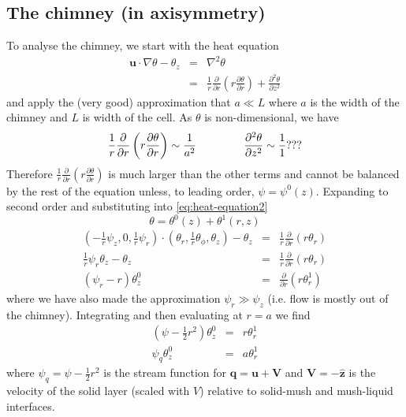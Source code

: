 \documentclass{article}
\begin{document}
\subsection{The chimney (in axisymmetry)}
To analyse the chimney, we start with the heat equation
\begin{eqnarray}
\mathbf{u} \cdot \nabla \theta - \theta_z &=& \nabla^2 \theta \label{eq:heat-equation2}\\
&=& \frac{1}{r} \frac{\partial}{\partial r} \left( r \frac{\partial \theta}{\partial r} \right) + \frac{\partial^2 \theta}{\partial z^2} 
\end{eqnarray}
and apply the (very good) approximation that $a \ll L$ where $a$ is the width of the chimney and $L$ is width of the cell. As $\theta$ is non-dimensional, we have
\begin{eqnarray}
\frac{1}{r} \frac{\partial}{\partial r} \left( r \frac{\partial \theta}{\partial r} \right) \sim \frac{1}{a^2} \hspace{10ex} \frac{\partial^2 \theta}{\partial z^2}  \sim \frac{1}{1} ???
\end{eqnarray}
Therefore $\frac{1}{r} \frac{\partial}{\partial r} \left( r \frac{\partial \theta}{\partial r} \right)$ is much larger than the other terms and cannot be balanced by the rest of the equation unless, to leading order, $\psi = \psi^0(z)$. Expanding to second order and substituting into \eqref{eq:heat-equation2}
\begin{equation}
\theta = \theta^0(z) + \theta^1(r, z)
\end{equation}
\begin{eqnarray}
\left( - \frac{1}{r} \psi_z, 0, \frac{1}{r} \psi_r \right) \cdot \left(\theta_r, \frac{1}{r} \theta_\phi , \theta_z \right) - \theta_z &=& \frac{1}{r} \frac{\partial}{\partial r} (r \theta_r) \\
 \frac{1}{r} \psi_r \theta_z  - \theta_z &=& \frac{1}{r} \frac{\partial}{\partial r} (r \theta_r)  \\
  (\psi_r - r)\theta^0_z  &=&  \frac{\partial}{\partial r} (r \theta^1_r)
\end{eqnarray}
where we have also made the approximation $\psi_r \gg \psi_z$ (i.e. flow is mostly out of the chimney). Integrating and then evaluating at $r=a$ we find
\begin{eqnarray}
(\psi - \frac{1}{2} r^2 ) \theta^0_z &=& r \theta^1_r \\
\psi_q \theta^0_z  &=&  a \theta^1_r \label{eq:chimney-heat-bc}
\end{eqnarray}
where $\psi_q = \psi - \frac{1}{2}r^2$ is the stream function for $\mathbf{q} = \mathbf{u} + \mathbf{V}$ and $\mathbf{V} = -\mathbf{\hat{z}}$ is the velocity of the solid layer (scaled with $V$) relative to solid-mush and mush-liquid interfaces. \\
\end{document}
